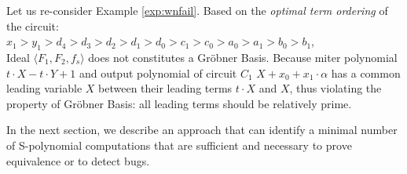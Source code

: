 \begin{Example}\label{exp:1bitmiter}
Let us re-consider Example \ref{exp:wnfail}. Based on the {\it optimal term ordering} of the circuit: \\
$ x_1 >  y_1 > d_4 > d_3 > d_2 > d_1> d_0 >c_1 > c_0 > a_0 > a_1 > b_0 > b_1$, \\ 
Ideal $\langle F_{1},F_{2}, f_{s} \rangle$ does not constitutes a Gr\"obner Basis.
Because miter polynomial $t\cdot X-t\cdot Y+1$ and output polynomial of circuit $C_1$ $X+x_0+x_1\cdot \alpha$ has a common leading variable $X$
between their leading terms $t\cdot X$ and $X$,
thus violating the property of Gr\"obner Basis: all leading terms should be relatively prime.  
\end{Example}


In the next section, we describe an approach that can identify a minimal number of S-polynomial computations that
are sufficient and necessary to prove equivalence or to detect bugs.


